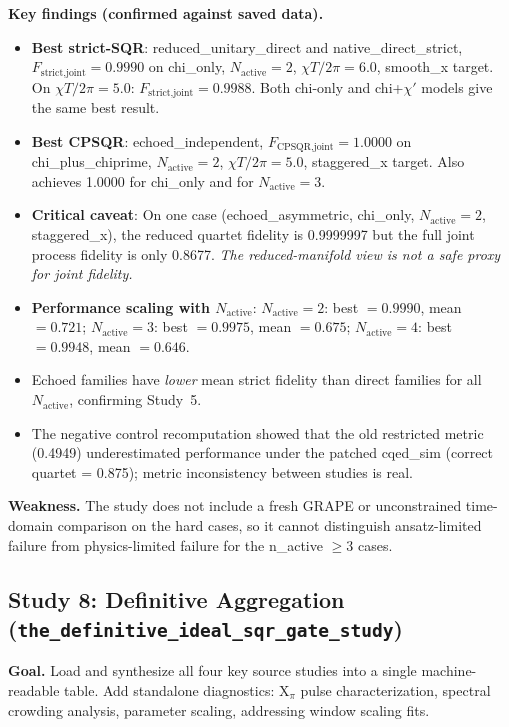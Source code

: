 \documentclass[11pt,letterpaper]{article}
\newcommand{\chiT}{\chi T / 2\pi}
\newcommand{\nact}{N_{\text{active}}}
\begin{document}
\textbf{Key findings (confirmed against saved data).}
\begin{itemize}
\item \textbf{Best strict-SQR}: reduced\_unitary\_direct and native\_direct\_strict,
  $F_\text{strict,joint} = 0.9990$ on chi\_only, $\nact = 2$, $\chiT = 6.0$,
  smooth\_x target.
  On $\chiT = 5.0$: $F_\text{strict,joint} = 0.9988$.
  Both chi-only and chi+$\chi'$ models give the same best result.
\item \textbf{Best CPSQR}: echoed\_independent,
  $F_\text{CPSQR,joint} = 1.0000$ on chi\_plus\_chiprime, $\nact = 2$,
  $\chiT = 5.0$, staggered\_x target.
  Also achieves 1.0000 for chi\_only and for $\nact = 3$.
\item \textbf{Critical caveat}: On one case (echoed\_asymmetric,
  chi\_only, $\nact = 2$, staggered\_x), the reduced quartet fidelity is 0.9999997
  but the full joint process fidelity is only 0.8677.
  \emph{The reduced-manifold view is not a safe proxy for joint fidelity.}
\item \textbf{Performance scaling with $\nact$}:
  $\nact = 2$: best $= 0.9990$, mean $= 0.721$;
  $\nact = 3$: best $= 0.9975$, mean $= 0.675$;
  $\nact = 4$: best $= 0.9948$, mean $= 0.646$.
\item Echoed families have \emph{lower} mean strict fidelity than direct families
  for all $\nact$, confirming Study~5.
\item The negative control recomputation showed that the old restricted metric
  (0.4949) underestimated performance under the patched cqed\_sim
  (correct quartet = 0.875); metric inconsistency between studies is real.
\end{itemize}

\textbf{Weakness.}  The study does not include a fresh GRAPE or unconstrained
time-domain comparison on the hard cases, so it cannot distinguish
ansatz-limited failure from physics-limited failure for the n\_active $\ge 3$
cases.

\subsection{Study 8: Definitive Aggregation (\texttt{the\_definitive\_ideal\_sqr\_gate\_study})}

\textbf{Goal.}  Load and synthesize all four key source studies into a single
machine-readable table. Add standalone diagnostics: X$_\pi$ pulse characterization,
spectral crowding analysis, parameter scaling, addressing window scaling fits.
\end{document}
